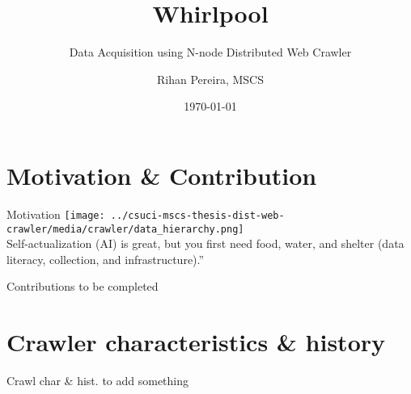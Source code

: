 \documentclass[9pt]{beamer}
\title{Whirlpool}
\subtitle{Data Acquisition using N-node Distributed Web Crawler}
\author{Rihan Pereira, MSCS}
\institute[California State University Channel Islands]
{
  \textit{Advisor:} Dr. Michael Soltys\\
  Department of Computer Science \\
  MSCS Graduate 2018-2019
}
\date{\today}
\begin{document}
\begin{frame}[plain]
  \titlepage
\end{frame}

\begin{frame}[plain]
  \tableofcontents[hideallsubsections]
\end{frame}

\section[Motiv. \& Contrib]{Motivation \& Contribution}
\begin{frame}[plain]
\end{frame}


\begin{frame}{Motivation}
  \centering
  \texttt{[image: ../csuci-mscs-thesis-dist-web-crawler/media/crawler/data\_hierarchy.png]}
  \pause
  \\
  Self-actualization (AI) is great, but you first need food, water, and shelter (data literacy, collection, and infrastructure).”
\end{frame}


\begin{frame}{Contributions}
  to be completed
\end{frame}


\section[Crawler history]{Crawler characteristics \& history}
\begin{frame}[plain]
\end{frame}


\begin{frame}{Crawl char \& hist.}
  to add something
\end{frame}

\end{document}
